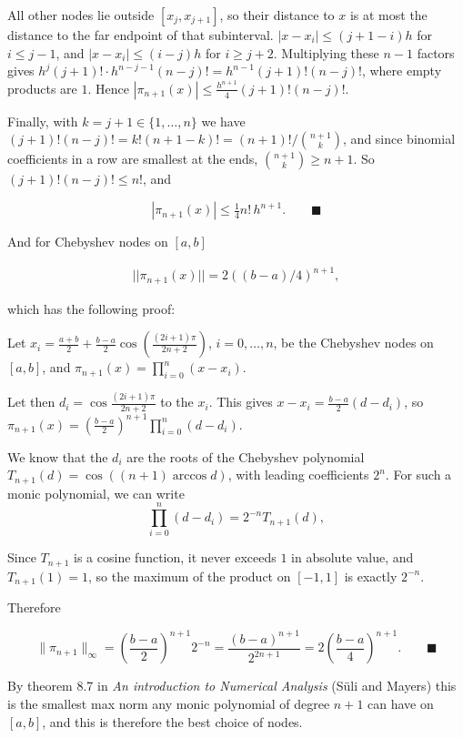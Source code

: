\documentclass{article}
\begin{document}
\vspace{5mm}
All other nodes lie outside $[x_j,x_{j+1}]$, so their distance to $x$ is at most the distance to the far endpoint of that subinterval. $|x-x_i| \le (j+1-i)h$ for $i \le j-1$, and $|x-x_i| \le (i-j)h$ for $i \ge j+2$. Multiplying these $n-1$ factors gives $h^{j}(j+1)! \cdot h^{n-j-1}(n-j)! = h^{n-1}(j+1)!(n-j)!$, where empty products are $1$. Hence $|\pi_{n+1}(x)| \le \frac{h^{n+1}}{4}(j+1)!(n-j)!$.

\vspace{5mm}
Finally, with $k = j+1 \in \{1,\dots,n\}$ we have $(j+1)!(n-j)! = k!(n+1-k)! = (n+1)!/\binom{n+1}{k}$, and since binomial coefficients in a row are smallest at the ends, $\binom{n+1}{k} \ge n+1$. So $(j+1)!(n-j)! \le n!$, and

$$|\pi_{n+1}(x)| \le \tfrac14 n!\,h^{n+1}. \qquad \blacksquare$$


And for Chebyshev nodes on $[a,b]$

\begin{align*}
    ||\pi_{n+1}(x)|| = 2 ((b-a)/4)^{n+1},
\end{align*}

which has the following proof:

\vspace{5mm}
Let $x_i = \frac{a+b}{2} + \frac{b-a}{2}\cos\!\left(\frac{(2i+1)\pi}{2n+2}\right)$, $i = 0,\dots,n$, be the Chebyshev nodes on $[a,b]$, and $\pi_{n+1}(x) = \prod_{i=0}^{n}(x-x_i)$.

Let then $d_i = \cos\frac{(2i+1)\pi}{2n+2}$ to the $x_i$. This gives $x - x_i = \frac{b-a}{2}(d-d_i)$, so $\pi_{n+1}(x) = \left(\frac{b-a}{2}\right)^{n+1}\prod_{i=0}^{n}(d-d_i)$.

We know that the $d_i$ are the roots of the Chebyshev polynomial $T_{n+1}(d) = \cos((n+1)\arccos d)$, with leading coefficients $2^{n}$. For such a monic polynomial, we can write $$\prod_{i=0}^{n}(d-d_i) = 2^{-n}T_{n+1}(d),$$ 

Since $T_{n+1}$ is a cosine function, it never exceeds $1$ in absolute value, and $T_{n+1}(1) = 1$, so the maximum of the product on $[-1,1]$ is exactly $2^{-n}$.

\vspace{5mm}
Therefore

$$\|\pi_{n+1}\|_\infty = \left(\frac{b-a}{2}\right)^{n+1}2^{-n} = \frac{(b-a)^{n+1}}{2^{2n+1}} = 2\left(\frac{b-a}{4}\right)^{n+1}. \qquad \blacksquare$$

By theorem 8.7 in \textit{An introduction to Numerical Analysis} (Süli and Mayers) this is the smallest max norm any monic polynomial of degree $n+1$ can have on $[a,b]$, and this is therefore the best choice of nodes.
\end{document}
